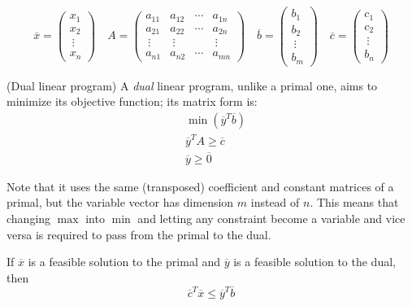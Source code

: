\[
    \overline{x} =
    \begin{pmatrix}
        x_1 \\ x_2 \\ \ \vdots \\ x_n
    \end{pmatrix}
    \quad
    A =
    \begin{pmatrix}
        a_{11} & a_{12} & \cdots & a_{1n} \\
        a_{21} & a_{22} & \cdots & a_{2n} \\
        \ \vdots & \ \vdots &  & \ \vdots \\
        a_{n1} & a_{n2} & \cdots & a_{mn}
    \end{pmatrix}
    \quad
    \overline{b} =
    \begin{pmatrix}
        b_1 \\ b_2 \\ \ \vdots \\ b_m
    \end{pmatrix}
    \quad
    \overline{c} =
    \begin{pmatrix}
        c_1 \\ c_2 \\ \ \vdots \\ b_n
    \end{pmatrix}
\]

\begin{definition}(Dual linear program)\label{def:lpdual}
    A \emph{dual} linear program, unlike a primal one, aims to minimize its objective function; its matrix form is:
    \begin{equation}\label{dual-matrix}
        \begin{aligned}
            &\min(\overline{y}^T \overline{b}) \\
            &\overline{y}^T A \geq \overline{c} \\
            &\overline{y} \geq \overline{0}
        \end{aligned}
    \end{equation}
    
    Note that it uses the same (transposed) coefficient and constant matrices of a primal, but the variable vector has dimension $m$ instead of $n$. This means that changing $\max$ into $\min$ and letting any constraint become a variable and vice versa is required to pass from the primal to the dual.
\end{definition}

\begin{theorem}\label{thm:weak-duality}
    If $\overline{x}$ is a feasible solution to the primal and $\overline{y}$ is a feasible solution to the dual, then
    \begin{equation}
        \overline{c}^T \overline{x} \leq \overline{y}^T \overline{b}
    \end{equation}
\end{theorem}


